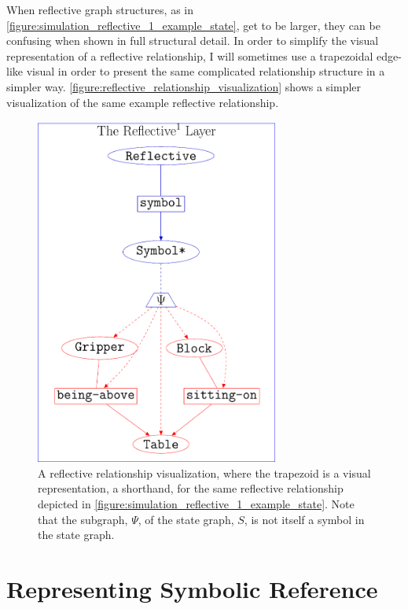 When reflective graph structures, as in
{\mbox{\autoref{figure:simulation_reflective_1_example_state}}}, get
to be larger, they can be confusing when shown in full structural
detail.  In order to simplify the visual representation of a
reflective relationship, I will sometimes use a trapezoidal edge-like
visual in order to present the same complicated relationship structure
in a simpler way.
{\mbox{\autoref{figure:reflective_relationship_visualization}}} shows
a simpler visualization of the same example reflective relationship.
\begin{figure}
\center
\includegraphics[width=8cm]{gfx/reflective_relationship_visualization}
\caption[A reflective relationship visualization.]{A reflective
  relationship visualization, where the trapezoid is a visual
  representation, a shorthand, for the same reflective relationship
  depicted in
  {\mbox{\autoref{figure:simulation_reflective_1_example_state}}}.
  Note that the subgraph, $\Psi$, of the state graph, $S$, is not
  itself a symbol in the state graph.}
\label{figure:reflective_relationship_visualization}
\end{figure}

\section{Representing Symbolic Reference}

